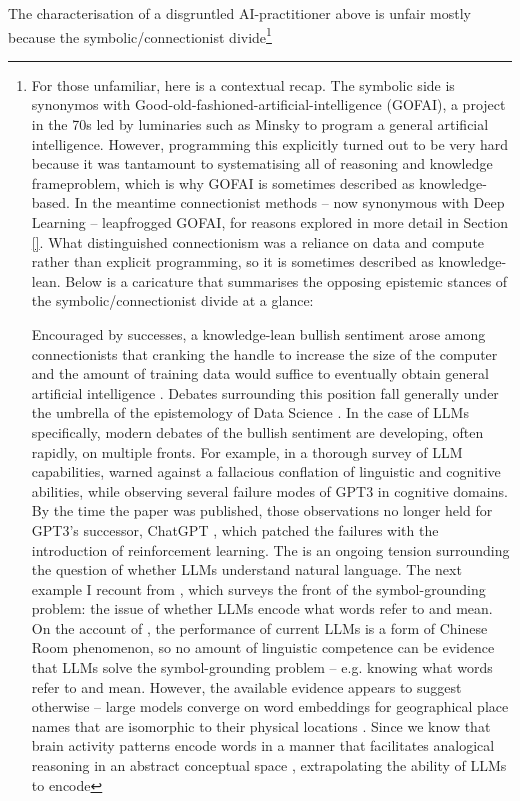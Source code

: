 The characterisation of a disgruntled AI-practitioner above is unfair mostly because the symbolic/connectionist divide\footnote{
For those unfamiliar, here is a contextual recap. The symbolic side is synonymos with Good-old-fashioned-artificial-intelligence (GOFAI), a project in the 70s led by luminaries such as Minsky \cite{} to program a general artificial intelligence. However, programming this explicitly turned out to be very hard because it was tantamount to systematising all of reasoning and knowledge \cite{}frameproblem, which is why GOFAI is sometimes described as knowledge-based. In the meantime connectionist methods -- now synonymous with Deep Learning \cite{} -- leapfrogged GOFAI, for reasons explored in more detail in Section \ref{}. What distinguished connectionism was a reliance on data and compute rather than explicit programming, so it is sometimes described as knowledge-lean. Below is a caricature \cite{deleted_user_stack_2018} that summarises the opposing epistemic stances of the symbolic/connectionist divide at a glance:

\begin{figure}
\centering
{}
\end{figure}

Encouraged by successes, a knowledge-lean bullish sentiment arose among connectionists that cranking the handle to increase the size of the computer and the amount of training data would suffice to eventually obtain general artificial intelligence \cite{anderson_end_2008}. Debates surrounding this position fall generally under the umbrella of the epistemology of Data Science \cite{pietsch_epistemology_2022,desai_epistemological_2022}. In the case of LLMs specifically, modern debates of the bullish sentiment are developing, often rapidly, on multiple fronts. For example, in a thorough survey of LLM capabilities, \cite{} warned against a fallacious conflation of linguistic and cognitive abilities, while observing several failure modes of GPT3 in cognitive domains. By the time the paper was published, those observations no longer held for GPT3's successor, ChatGPT \cite{}, which patched the failures with the introduction of reinforcement learning. The is an ongoing tension surrounding the question of whether LLMs understand natural language. The next example I recount from \cite{}, which surveys the front of the symbol-grounding problem: the issue of whether LLMs encode what words refer to and mean. On the account of \cite{bender_climbing_2020}, the performance of current LLMs is a form of Chinese Room \cite{searle_minds_1980} phenomenon, so no amount of linguistic competence can be evidence that LLMs solve the symbol-grounding problem -- e.g. knowing what words refer to and mean. However, the available evidence appears to suggest otherwise -- large models converge on word embeddings for geographical place names that are isomorphic to their physical locations \cite{}. Since we know that brain activity patterns encode words in a manner that facilitates analogical reasoning in an abstract conceptual space \cite{}, extrapolating the ability of LLMs to encode


}
